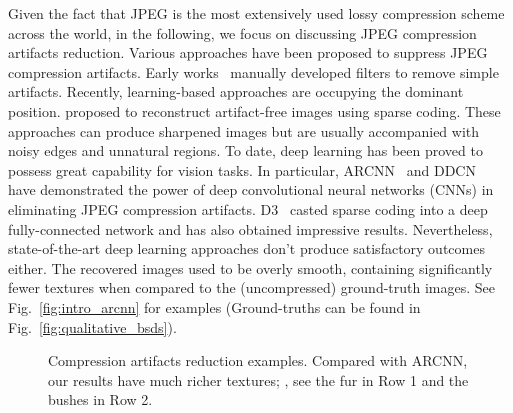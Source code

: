 \documentclass[10pt,twocolumn,letterpaper]{article}
\begin{document}
Given the fact that JPEG is the most extensively used lossy compression scheme across the world, in the following, we focus on discussing JPEG compression artifacts reduction. Various approaches have been proposed to suppress JPEG compression artifacts. Early works~\cite{review_of_postprocessing} manually developed filters to remove simple artifacts. Recently, learning-based approaches are occupying the dominant position. \cite{image_deblocking,a_learning_based,reducing_artifacts,data_driven_sparsity,inter_block_consistent,efficient_regression_priors} proposed to reconstruct artifact-free images using sparse coding. These approaches can produce sharpened images but are usually accompanied with noisy edges and unnatural regions. To date, deep learning has been proved to possess great capability for vision tasks. In particular, ARCNN~\cite{arcnn} and DDCN~\cite{ddcn} have demonstrated the power of deep convolutional neural networks (CNNs) in eliminating JPEG compression artifacts. D3~\cite{d3} casted sparse coding into a deep fully-connected network and has also obtained impressive results. Nevertheless, state-of-the-art deep learning approaches don't produce satisfactory outcomes either. The recovered images used to be overly smooth, containing significantly fewer textures when compared to the (uncompressed) ground-truth images. See Fig.~\ref{fig:intro_arcnn} for examples (Ground-truths can be found in Fig.~\ref{fig:qualitative_bsds}).

\begin{figure}[t]
\vspace{-1em}
\centering
{}
\hfil
{}
\vspace{-0.9em}
\caption{Compression artifacts reduction examples. Compared with ARCNN, our results have much richer textures; \eg, see the fur in Row 1 and the bushes in Row 2.}
\label{fig:intro}
\vspace{-1.5em}
\end{figure}
\end{document}

